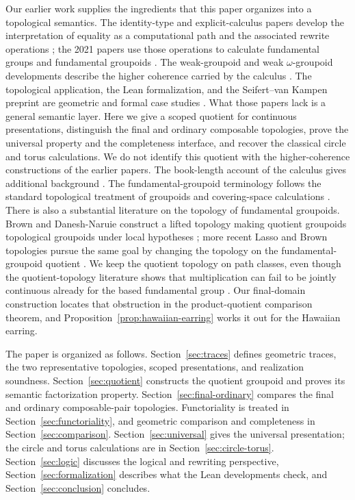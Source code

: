 \documentclass[10pt,reqno]{amsart}
\theoremstyle{definition}
\theoremstyle{plain}
\theoremstyle{remark}
\begin{document}
Our earlier work supplies the ingredients that this paper organizes into a
topological semantics.  The identity-type and explicit-calculus papers
develop the interpretation of equality as a computational path and the
associated rewrite operations
\cite{RamosDeQueirozDeOliveira2016propositional,Ramos2017identity,
RamosDeQueirozDeOliveiraDeVeras2018explicit}; the 2021 papers use those
operations to calculate fundamental groups and fundamental groupoids
\cite{RamosDeQueirozDeOliveira2021calculation,
RamosDeQueirozDeOliveira2021fundamental}.  The weak-groupoid and weak
$\omega$-groupoid developments describe the higher coherence carried by the
calculus \cite{DeVerasRamosDeQueirozDeOliveira2025weak,
RamosEtAl2025OmegaPreprint}.  The topological application, the Lean
formalization, and the Seifert--van Kampen preprint are geometric and formal
case studies \cite{DeVerasRamosDeQueirozDeOliveira2025topological,
RamosEtAl2025LeanPreprint,RamosEtAl2025SVKPreprint}.  What those papers lack
is a general semantic layer.  Here we give a scoped quotient for continuous
presentations, distinguish the final and ordinary composable topologies, prove
the universal property and the completeness interface, and recover the
classical circle and torus calculations.  We do not identify this quotient
with the higher-coherence constructions of the earlier papers.
The book-length account of the calculus gives additional background
\cite{RamosDeQueirozDeOliveiraGabbay2026}.
The fundamental-groupoid terminology follows the standard topological
treatment of groupoids and covering-space calculations \cite{Brown06,Hatcher02}.
There is also a substantial literature on the topology of fundamental
groupoids.  Brown and Danesh-Naruie construct a lifted topology making
quotient groupoids topological groupoids under local hypotheses
\cite{BrownDaneshNaruie75}; more recent Lasso and Brown topologies pursue the
same goal by changing the topology on the fundamental-groupoid quotient
\cite{PakdamanShahini21,PakdamanShahini23}.  We keep the quotient topology
on path classes, even though the quotient-topology literature shows that
multiplication can fail to be jointly continuous already for the based
fundamental group \cite{Fabel11,BrazasFabel13}.  Our final-domain construction
locates that obstruction in the product-quotient comparison theorem, and
Proposition~\ref{prop:hawaiian-earring} works it out for the Hawaiian
earring.

The paper is organized as follows.  Section~\ref{sec:traces} defines geometric traces, the
two representative topologies, scoped presentations, and realization soundness.
Section~\ref{sec:quotient} constructs the
quotient groupoid and proves its semantic factorization property.  Section~\ref{sec:final-ordinary}
compares the final and ordinary composable-pair topologies.  Functoriality is
treated in Section~\ref{sec:functoriality}, and geometric comparison and completeness in Section~\ref{sec:comparison}.
Section~\ref{sec:universal} gives the universal presentation; the circle and torus calculations
are in Section~\ref{sec:circle-torus}.  Section~\ref{sec:logic} discusses the logical and rewriting perspective,
Section~\ref{sec:formalization} describes what the Lean developments check, and
Section~\ref{sec:conclusion} concludes.
\end{document}
